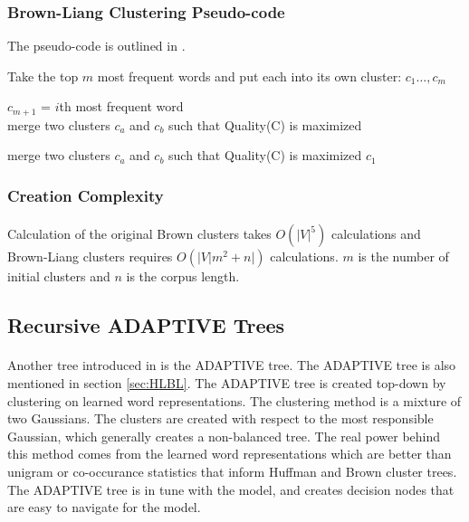 \subsubsection{Brown-Liang Clustering Pseudo-code}
The pseudo-code is outlined in \cite{Collins2011}.
\begin{algorithm}
\SetAlgoLined
Take the top $m$ most frequent words and put each into its own cluster: $c_1\dots,c_m$

 {
	$c_{m+1}$ = $i$th most frequent word
	\\
	merge two clusters $c_a$ and $c_b$ such that Quality(C) is maximized
	
}
 {
merge two clusters $c_a$ and $c_b$ such that Quality(C) is maximized
}
\Return $c_1$
\end{algorithm}

\subsubsection{Creation Complexity}
\paragraph{}
Calculation of the original Brown clusters takes $O(|V|^5)$ calculations and Brown-Liang clusters requires $O(|V| m^2+n|)$ calculations. $m$ is the number of initial clusters and $n$ is the corpus length.  

\subsection{Recursive ADAPTIVE Trees}
\paragraph{}
Another tree introduced in \cite{MnihHinton2009} is the ADAPTIVE tree. The ADAPTIVE tree is also mentioned in section \ref{sec:HLBL}. The ADAPTIVE tree is created top-down by clustering on learned word representations. The clustering method is a mixture of two Gaussians. The clusters are created with respect to the most responsible Gaussian, which generally creates a non-balanced tree. The real power behind this method comes from the learned word representations which are better than unigram or co-occurance statistics that inform Huffman and Brown cluster trees. The ADAPTIVE tree is in tune with the model, and creates decision nodes that are easy to navigate for the model. 
